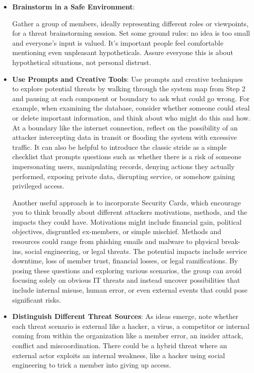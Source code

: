 \begin{itemize}

    \item \textbf{Brainstorm in a Safe Environment}:
    
    Gather a group of members, ideally representing different roles or viewpoints,
    for a threat brainstorming session. Set some ground rules: no idea is
    too small and everyone's input is valued. It's important
    people feel comfortable mentioning even unpleasant hypotheticals.
    Assure everyone this is about hypothetical situations,
    not personal distrust.

    \item \textbf{Use Prompts and Creative Tools}:
    Use prompts and creative techniques to explore potential threats by walking
    through the system map from Step 2 and pausing at each component or boundary to
    ask what could go wrong. For example, when examining the database, consider
    whether someone could steal or delete important information, and think about who
    might do this and how. At a boundary like the internet connection, reflect on
    the possibility of an attacker intercepting data in transit or flooding the
    system with excessive traffic. It can also be helpful to introduce the classic
    \gls{stride} as a simple checklist that prompts questions such as
    whether there is a risk of someone impersonating users,
    manipulating records, denying actions they actually performed, exposing private
    data, disrupting service, or somehow gaining privileged access.

    Another useful approach is to incorporate Security Cards, which
    encourage you to think broadly about different attackers
    motivations, methods, and the impacts they could have.
    Motivations might include financial gain, political objectives, disgruntled
    ex-members, or simple mischief. Methods and resources could range from phishing
    emails and malware to physical break-ins, social engineering, or legal threats.
    The potential impacts include service downtime, loss of member trust, financial
    losses, or legal ramifications. By posing these questions and exploring various
    scenarios, the group can avoid focusing solely on obvious IT threats and instead
    uncover possibilities that include internal misuse, human error, or even
    external events that could pose significant risks.

    \item \textbf{Distinguish Different Threat Sources}:
    As ideas emerge, note whether each threat
    scenario is external like a hacker, a virus, a competitor
    or internal coming from within the organization like a member error,
    an insider attack, conflict and miscoordination. There could be a hybrid threat
    where an external actor exploits an internal weakness, like a hacker using
    social engineering to trick a member into giving up access.


\end{itemize}
